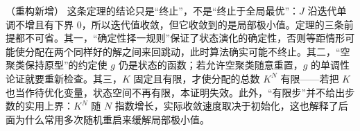 \documentclass[../../main.tex]{subfiles}
\begin{document}
\begin{remark}（重构新增）
这条定理的结论只是“终止”，不是“终止于全局最优”：$J$ 沿迭代单调不增且有下界 $0$，所以迭代值收敛，但它收敛到的是局部极小值。定理的三条前提都不可省。其一，“确定性择一规则”保证了状态演化的确定性，否则等距情形可能使分配在两个同样好的解之间来回跳动，此时算法确实可能不终止。其二，“空聚类保持原型”的约定使 $g$ 仍是状态的函数；若允许空聚类随意重置，$g$ 的单调性论证就要重新检查。其三，$K$ 固定且有限，才使分配的总数 $K^{N}$ 有限——若把 $K$ 也当作待优化变量，状态空间不再有限，本证明失效。此外，“有限步”并不给出步数的实用上界：$K^{N}$ 随 $N$ 指数增长，实际收敛速度取决于初始化，这也解释了后面为什么常用多次随机重启来缓解局部极小值。
\end{remark}
\end{document}
